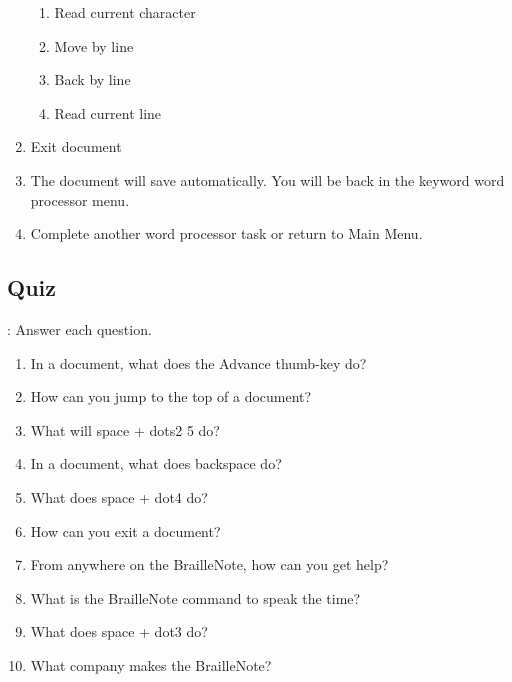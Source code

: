 \documentclass[10pt,letterpaper,twoside]{report}
\begin{document}
\begin{enumerate}
\begin{enumerate}
		      \item Read current character 
		      \item Move by line 
		      \item Back by line 
		      \item Read current line 
	      \end{enumerate}
	\item Exit document 
	\item The document will save automatically. You will be back in the keyword word processor menu.
	\item Complete another word processor task or return to Main Menu.
\end{enumerate}

\clearpage 
\subsection{Quiz}:
Answer each question.
\begin{enumerate}
	\item In a document, what does the Advance thumb-key do?
	\item How can you jump to the top of a document?
	\item What will space + dots2 5 do?
	\item In a document, what does backspace do?
	\item  What does space + dot4 do?
	\item How can you exit a document?
	\item From anywhere on the BrailleNote, how can you get help?
	\item What is the BrailleNote command to speak the time?
	\item What does space + dot3 do?
	\item What company makes the BrailleNote?
\end{enumerate}

\clearpage
\end{document}
